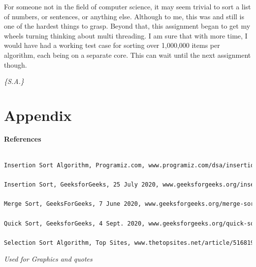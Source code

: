 \documentclass[letterpaper, 10pt]{article}
\begin{document}
 For someone not in the field of computer science, it may seem trivial to sort a list of numbers, or sentences, or anything else. Although to me, this was and still is one of the hardest things to grasp. Beyond that, this assignment began to get my wheels turning thinking about multi threading. I am sure that with more time, I would have had a working test case for  sorting over 1,000,000 items per algorithm, each being on a separate core. This can wait until the next assignment though.
 
{\textit{\color{red}\huge{\{S.A.\}}}}
\newpage
\section{Appendix}

\center\large\textbf{References}
\begin{small}

 \begin{lstlisting}[language=TeX]
 
Insertion Sort Algorithm, Programiz.com, www.programiz.com/dsa/insertion-sort. 

Insertion Sort, GeeksforGeeks, 25 July 2020, www.geeksforgeeks.org/insertion-sort/.

Merge Sort, GeeksForGeeks, 7 June 2020, www.geeksforgeeks.org/merge-sort/. 

Quick Sort, GeeksforGeeks, 4 Sept. 2020, www.geeksforgeeks.org/quick-sort/?ref=lbp. 

Selection Sort Algorithm, Top Sites, www.thetopsites.net/article/51681938.shtml. 
\end{lstlisting}
\textit{Used for Graphics and quotes}
\end{small}
\end{document}
